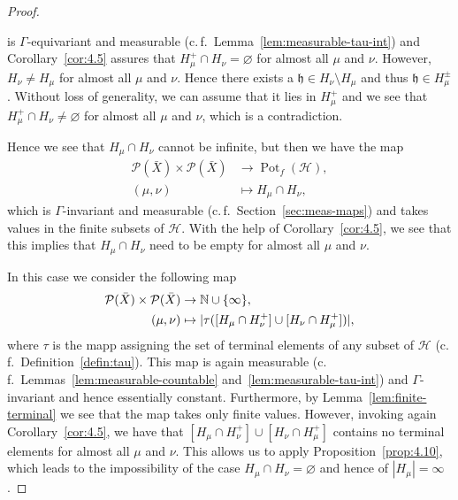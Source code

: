\begin{proof}
\begin{description}
    is \(\Gamma\)-equivariant and measurable (c.\,f.\ Lemma~\ref{lem:measurable-tau-int}) and Corollary~\ref{cor:4.5} assures that \(H_\mu^+ \cap H_\nu = \varnothing\) for almost all \(\mu\) and \(\nu\). However, \(H_\nu \neq H_\mu\) for almost all \(\mu\) and \(\nu\). Hence there exists a \(\mathfrak{h} \in H_\nu \setminus H_\mu\) and thus \(\mathfrak{h} \in H_\mu^\pm\). Without loss of generality, we can assume that it lies in \(H_\mu^+\) and we see that \(H_\mu^+ \cap H_\nu \neq \varnothing\) for almost all \(\mu\) and \(\nu\), which is a contradiction.
  \end{description}
  Hence we see that \(H_\mu \cap H_\nu\) cannot be infinite, but then we have the map
  \begin{align*}
    \mathcal{P}(\bar X) \times \mathcal{P}(\bar X) & \to \operatorname{Pot}_f(\mathcal{H}),\\
    (\mu,\nu) &\mapsto H_\mu \cap H_\nu,
  \end{align*}
  which is \(\Gamma\)-invariant and measurable (c.\,f.~Section~\ref{sec:meas-maps}) and takes values in the finite subsets of \(\mathcal{H}\). With the help of Corollary~\ref{cor:4.5}, we see that this implies that \(H_\mu \cap H_\nu\) need to be empty for almost all \(\mu\) and \(\nu\).

  In this case we consider the following map
  \begin{align*}
    \mathcal{P}(\bar X) \times \mathcal{P}(\bar X) &\to \mathbb{N} \cup \{\infty\},\\
    (\mu, \nu) &\mapsto |\tau([H_\mu \cap H_\nu^+] \cup [H_\nu \cap H_\mu^+])|,
  \end{align*}
  where \(\tau\) is the mapp assigning the set of terminal elements of any subset of \(\mathcal{H}\) (c.\,f.~Definition~\ref{defin:tau}). This map is again measurable (c.\,f.\ Lemmas~\ref{lem:measurable-countable} and~\ref{lem:measurable-tau-int}) and \(\Gamma\)-invariant and hence essentially constant. Furthermore, by Lemma~\ref{lem:finite-terminal} we see that the map takes only finite values. However, invoking again Corollary~\ref{cor:4.5}, we have that \([H_\mu \cap H_\nu^+] \cup [H_\nu \cap H_\mu^+]\) contains no terminal elements for almost all \(\mu\) and \(\nu\). This allows us to apply Proposition~\ref{prop:4.10}, which leads to the impossibility of the case \(H_\mu \cap H_\nu = \varnothing\) and hence of \(|H_\mu| = \infty\). 


\end{proof}
